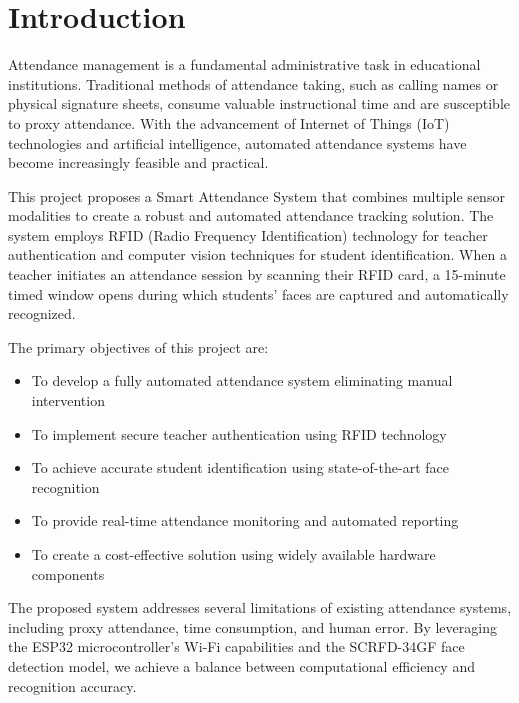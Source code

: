 \documentclass[12pt,a4paper]{article}
\begin{document}
\tableofcontents
\pagebreak

\listoffigures
\pagebreak

\listoftables
\pagebreak

\section{Introduction}

Attendance management is a fundamental administrative task in educational institutions. Traditional methods of attendance taking, such as calling names or physical signature sheets, consume valuable instructional time and are susceptible to proxy attendance. With the advancement of Internet of Things (IoT) technologies and artificial intelligence, automated attendance systems have become increasingly feasible and practical.

This project proposes a Smart Attendance System that combines multiple sensor modalities to create a robust and automated attendance tracking solution. The system employs RFID (Radio Frequency Identification) technology for teacher authentication and computer vision techniques for student identification. When a teacher initiates an attendance session by scanning their RFID card, a 15-minute timed window opens during which students' faces are captured and automatically recognized.

The primary objectives of this project are:
\begin{itemize}
	\item To develop a fully automated attendance system eliminating manual intervention
	\item To implement secure teacher authentication using RFID technology
	\item To achieve accurate student identification using state-of-the-art face recognition
	\item To provide real-time attendance monitoring and automated reporting
	\item To create a cost-effective solution using widely available hardware components
\end{itemize}

The proposed system addresses several limitations of existing attendance systems, including proxy attendance, time consumption, and human error. By leveraging the ESP32 microcontroller's Wi-Fi capabilities and the SCRFD-34GF face detection model, we achieve a balance between computational efficiency and recognition accuracy.
\end{document}
